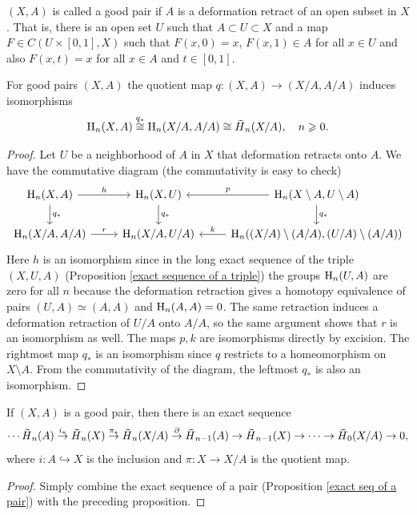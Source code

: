 \begin{defn}
    $(X,A)$ is called a good pair if $A$ is a deformation retract of an open subset in $X$. That is, there is an open set $U$ such that $A\subset U\subset X$ and a map $F\in C(U\times[0,1],X)$ such that $F(x,0)=x$, $F(x,1)\in A$ for all $x\in U$ and also $F(x,t)=x$ for all $x\in A$ and $t\in [0,1]$.
\end{defn}

\begin{prop}
    For good pairs $(X,A)$ the quotient map $q:(X,A)\to (X/A,A/A)$ induces isomorphisms \[\rmH_n(X,A)\overset{q_\ast}\cong \rmH_n(X/A,A/A)\cong \wt{H}_n(X/A),\quad n\geq 0.\]
\end{prop}
\begin{proof}
     Let $U$ be a neighborhood of $A$ in $X$ that deformation retracts onto $A$. We have the commutative diagram (the commutativity is easy to check)
      \[\begin{tikzcd}
        \rmH_n(X,A) \arrow[r,"h"]\arrow[d,"q_\ast"] & \rmH_n(X,U)\arrow[d,"q_\ast"]\ar[r,leftarrow,"p"] & \rmH_n(X\setminus A,U\setminus A)\arrow[d,"q_\ast"] \\
        \rmH_n(X/ A,A/A)\arrow[r,"r"] &\rmH_n(X/A,U/A) \ar[r,leftarrow,"k"] &\rmH_n((X/A)\setminus (A/A),(U/A)\setminus(A/A))
    \end{tikzcd}\]
    Here $h$ is an isomorphism since in the long exact sequence of the triple $(X,U,A)$ (Proposition \ref{exact sequence of a triple}) the groups $\mathrm{H}_n(U,A)$ are zero for all $n$ because the deformation retraction gives a homotopy equivalence of pairs $(U,A)\simeq (A,A)$ and $\mathrm{H}_n(A,A)=0$. The same retraction induces a deformation retraction of $U/A$ onto $A/A$, so the same argument shows that $r$ is an isomorphism as well. The maps $p,k$ are isomorphisms directly by excision. The rightmost map $q_\ast$ is an isomorphism since $q$ restricts to a homeomorphism on $X\setminus A$. From the commutativity of the diagram, the leftmost $q_\ast$ is also an isomorphism.
\end{proof}

\begin{thm}
    If $(X,A)$ is a good pair, then there is an exact sequence
    \[\cdots \wt{H}_n(A)\overset{i_\ast}\to \wt{H}_n(X)\overset{\pi_\ast}\to \wt{H}_n(X/A)\overset\partial\to \wt{H}_{n-1}(A)\to \wt{H}_{n-1}(X)\to \cdots \to \wt{H}_0(X/A)\to 0,\]
    where $i:A\hookrightarrow X$ is the inclusion and $\pi:X\to X/A$ is the quotient map.
\end{thm}
\begin{proof}
     Simply combine the exact sequence of a pair (Proposition \ref{exact seq of a pair}) with the preceding proposition.
\end{proof}


